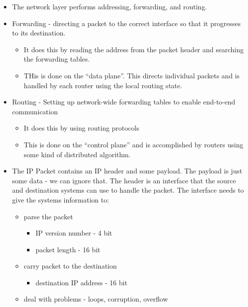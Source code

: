 \begin{itemize}
\tightlist
\item
  The network layer performs addressing, forwarding, and routing.
\item
  Forwarding - directing a packet to the correct interface so that it
  progresses to its destination.

  \begin{itemize}
  \tightlist
  \item
    It does this by reading the address from the packet header and
    searching the forwarding tables.
  \item
    THis is done on the ``data plane''. This directs individual packets
    and is handled by each router using the local routing state.
  \end{itemize}
\item
  Routing - Setting up network-wide forwarding tables to enable
  end-to-end communication

  \begin{itemize}
  \tightlist
  \item
    It does this by using routing protocols
  \item
    This is done on the ``control plane'' and is accomplished by routers
    using some kind of distributed algorithm.
  \end{itemize}
\item
  The IP Packet contains an IP header and some payload. The payload is
  just some data - we can ignore that. The header is an interface that
  the source and destination systems can use to handle the packet. The
  interface needs to give the systems information to:

  \begin{itemize}
  \tightlist
  \item
    parse the packet

    \begin{itemize}
    \tightlist
    \item
      IP version number - 4 bit
    \item
      packet length - 16 bit
    \end{itemize}
  \item
    carry packet to the destination

    \begin{itemize}
    \tightlist
    \item
      destination IP address - 16 bit
    \end{itemize}
  \item
    deal with problems - loops, corruption, overflow


\end{itemize}
\end{itemize}
